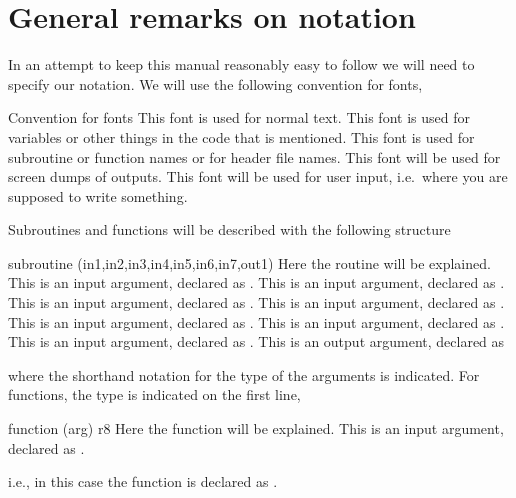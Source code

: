 \chapter{General remarks on notation}


In an attempt to keep this manual reasonably easy to follow we will
need to specify our notation.  We will use the following convention
for fonts,
\begin{sub}{Convention for fonts}
   This font is used for normal text.
   This font is used for variables or other things
  in the code that is mentioned.
   This font is used for subroutine or function
  names or for header file names.
   This font will be used for screen dumps of outputs.
   This font will be used for user
  input, i.e.\ where you are supposed to write something.
\end{sub}

Subroutines and functions will be described with the following
structure
\begin{sub}{subroutine (in1,in2,in3,in4,in5,in6,in7,out1)}
   Here the routine will be explained.
   This is an input argument, declared as .
   This is an input argument, declared as .
   This is an input argument, declared as .
   This is an input argument, declared as .
   This is an input argument, declared as .
   This is an input argument, declared as .
   This is an input argument, declared as .
   This is an output argument, declared as 
\end{sub}
where the shorthand notation for the type of the arguments is
indicated. For functions, the type is indicated on the first line,
\begin{sub}{function (arg) \hfill r8}
   Here the function will be explained.
   This is an input argument, declared as .
\end{sub}
i.e., in this case the function is declared as .


